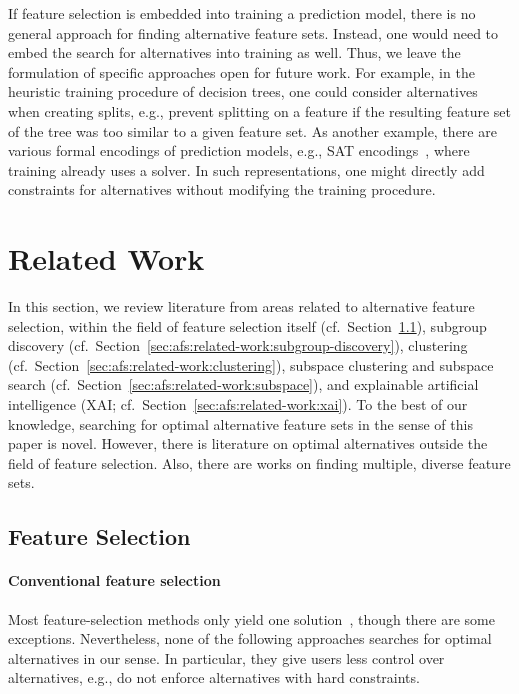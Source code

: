 \documentclass{article}
\theoremstyle{definition}
\begin{document}
If feature selection is embedded into training a prediction model, there is no general approach for finding alternative feature sets.
Instead, one would need to embed the search for alternatives into training as well.
Thus, we leave the formulation of specific approaches open for future work.
For example, in the heuristic training procedure of decision trees, one could consider alternatives when creating splits, e.g., prevent splitting on a feature if the resulting feature set of the tree was too similar to a given feature set.
As another example, there are various formal encodings of prediction models, e.g., \textsc{SAT} encodings~\cite{narodytska2018learning, schidler2021sat, yu2021learning}, where training already uses a solver.
In such representations, one might directly add constraints for alternatives without modifying the training procedure.

\section{Related Work}
\label{sec:afs:related-work}

In this section, we review literature from areas related to alternative feature selection, within the field of feature selection itself (cf.~Section~\ref{sec:afs:related-work:feature-selection}), subgroup discovery (cf.~Section~\ref{sec:afs:related-work:subgroup-discovery}), clustering (cf.~Section~\ref{sec:afs:related-work:clustering}), subspace clustering and subspace search (cf.~Section~\ref{sec:afs:related-work:subspace}), and explainable artificial intelligence (XAI; cf.~Section~\ref{sec:afs:related-work:xai}).
To the best of our knowledge, searching for optimal alternative feature sets in the sense of this paper is novel.
However, there is literature on optimal alternatives outside the field of feature selection.
Also, there are works on finding multiple, diverse feature sets.

\subsection{Feature Selection}
\label{sec:afs:related-work:feature-selection}

\paragraph{Conventional feature selection}

Most feature-selection methods only yield one solution~\cite{borboudakis2021extending}, though there are some exceptions.
Nevertheless, none of the following approaches searches for optimal alternatives in our sense.
In particular, they give users less control over alternatives, e.g., do not enforce alternatives with hard constraints.
\end{document}
